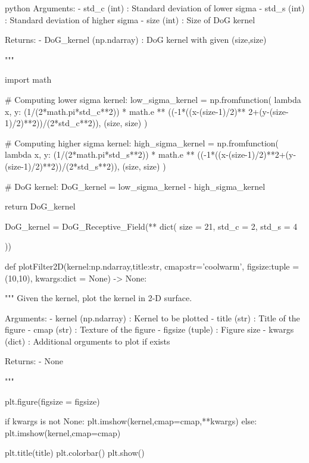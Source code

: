 \documentclass[12pt]{amsart}
\begin{document}
\begin{mintedbox}{python}
            Arguments:
                - std_c (int) : Standard deviation of lower sigma
                - std_s (int) : Standard deviation of higher sigma
                - size  (int) : Size of DoG kernel

            Returns:
               - DoG_kernel (np.ndarray) : DoG kernel with given (size,size)

    """


    import math

    # Computing lower sigma kernel:
    low_sigma_kernel  = np.fromfunction(
        lambda x, y: (1/(2*math.pi*std_c**2)) * math.e ** ((-1*((x-(size-1)/2)** 2+(y-(size-1)/2)**2))/(2*std_c**2)), (size, size)        
        )

    # Computing higher sigma kernel:
    high_sigma_kernel = np.fromfunction(
        lambda x, y: (1/(2*math.pi*std_s**2)) * math.e ** ((-1*((x-(size-1)/2)**2+(y-(size-1)/2)**2))/(2*std_s**2)), (size, size)
        )

    # DoG kernel:
    DoG_kernel = low_sigma_kernel - high_sigma_kernel


    return DoG_kernel

DoG_kernel = DoG_Receptive_Field(**
dict(
    size = 21,
    std_c = 2,
    std_s = 4

))

def plotFilter2D(kernel:np.ndarray,title:str,
                 cmap:str='coolwarm',
                 figsize:tuple = (10,10),
                 kwargs:dict = None) -> None:

    """
        Given the kernel, plot the kernel in 2-D surface.

            Arguments:
                - kernel (np.ndarray) : Kernel to be plotted
                - title  (str)        : Title of the figure
                - cmap   (str)        : Texture of the figure
                - figsize (tuple)     : Figure size
                - kwargs (dict)       : Additional orguments to plot if exists

            Returns:
                - None



    """

    plt.figure(figsize = figsize)

    if kwargs is not None:
        plt.imshow(kernel,cmap=cmap,**kwargs)
    else:
        plt.imshow(kernel,cmap=cmap)       
    
    plt.title(title)
    plt.colorbar()
    plt.show()





\end{mintedbox}
\end{document}
